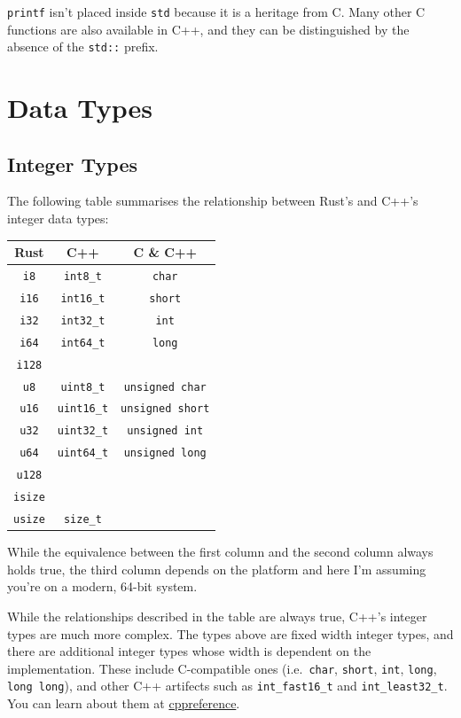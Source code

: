 \documentclass[
]{book}
\begin{document}
\texttt{printf} isn't placed inside \texttt{std} because it is a heritage from C. Many other C functions
are also available in C++, and they can be distinguished by the absence of the \texttt{std::} prefix.

\hypertarget{data-types}{%
\section{Data Types}\label{data-types}}

\hypertarget{integer-types}{%
\subsection{Integer Types}\label{integer-types}}

The following table summarises the relationship between Rust's and C++'s integer data types:

\begin{longtable}[]{@{}ccc@{}}
\toprule
Rust & C++ & C \& C++\tabularnewline
\midrule
\endhead
\texttt{i8} & \texttt{int8\_t} & \texttt{char}\tabularnewline
\texttt{i16} & \texttt{int16\_t} & \texttt{short}\tabularnewline
\texttt{i32} & \texttt{int32\_t} & \texttt{int}\tabularnewline
\texttt{i64} & \texttt{int64\_t} & \texttt{long}\tabularnewline
\texttt{i128} & &\tabularnewline
\texttt{u8} & \texttt{uint8\_t} & \texttt{unsigned\ char}\tabularnewline
\texttt{u16} & \texttt{uint16\_t} & \texttt{unsigned\ short}\tabularnewline
\texttt{u32} & \texttt{uint32\_t} & \texttt{unsigned\ int}\tabularnewline
\texttt{u64} & \texttt{uint64\_t} & \texttt{unsigned\ long}\tabularnewline
\texttt{u128} & &\tabularnewline
\texttt{isize} & &\tabularnewline
\texttt{usize} & \texttt{size\_t} &\tabularnewline
\bottomrule
\end{longtable}

While the equivalence between the first column and the second column always holds true,
the third column depends on the platform and here I'm assuming you're on a modern, 64-bit
system.

While the relationships described in the table are always true, C++'s integer types
are much more complex. The types above are fixed width integer types, and there are
additional integer types whose width is dependent on the implementation. These include
C-compatible ones (i.e.~\texttt{char}, \texttt{short}, \texttt{int}, \texttt{long}, \texttt{long\ long}), and other C++
artifects such as \texttt{int\_fast16\_t} and \texttt{int\_least32\_t}. You can learn about them at
\href{https://en.cppreference.com/w/cpp/types/integer}{cppreference}.
\end{document}
